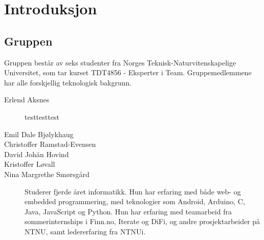 \chapter{Introduksjon}
\section{Gruppen}
Gruppen består av seks studenter fra Norges Teknisk-Naturvitenskapelige 
Universitet, som tar kurset TDT4856 - Eksperter i Team. Gruppemedlemmene 
har alle forskjellig teknologisk bakgrunn.
\begin{description}
	\item[Erlend Aksnes] testtesttest%
	\item[Emil Dale Bjølykhaug] %
	\item[Christoffer Ramstad-Evensen] %
	\item[David Johän Hovind] %
	\item[Kristoffer Løvall] %
	\item[Nina Margrethe Smørsgård] \comment{\hfill \\}Studerer fjerde året 
	informatikk. Hun har erfaring med både web- og embedded programmering, med 
	teknologier som Android, Arduino, C, Java, JavaScript og Python. Hun har 
	erfaring med teamarbeid fra sommerinternships i Finn.no, Iterate og DiFi, 
	og andre prosjektarbeider på NTNU, samt ledererfaring fra NTNUi.
\end{description}
